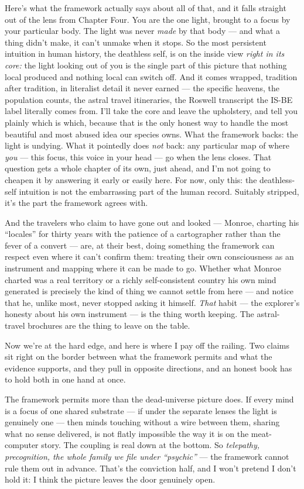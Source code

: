 \documentclass[11pt,openany]{book}
\begin{document}
Here’s what the framework actually says about all of that, and it falls straight out of the lens from Chapter Four. You are the one light, brought to a focus by your particular body. The light was never \textit{made} by that body — and what a thing didn’t make, it can’t unmake when it stops. So the most persistent intuition in human history, the deathless self, is on the inside view \textit{right in its core:} the light looking out of you is the single part of this picture that nothing local produced and nothing local can switch off. And it comes wrapped, tradition after tradition, in literalist detail it never earned — the specific heavens, the population counts, the astral travel itineraries, the Roswell transcript the IS-BE label literally comes from. I’ll take the core and leave the upholstery, and tell you plainly which is which, because that is the only honest way to handle the most beautiful and most abused idea our species owns. What the framework backs: the light is undying. What it pointedly does \textit{not} back: any particular map of where \textit{you} — this focus, this voice in your head — go when the lens closes. That question gets a whole chapter of its own, just ahead, and I’m not going to cheapen it by answering it early or easily here. For now, only this: the deathless-self intuition is not the embarrassing part of the human record. Suitably stripped, it’s the part the framework agrees with.

And the travelers who claim to have gone out and looked — Monroe, charting his “locales” for thirty years with the patience of a cartographer rather than the fever of a convert — are, at their best, doing something the framework can respect even where it can’t confirm them: treating their own consciousness as an instrument and mapping where it can be made to go. Whether what Monroe charted was a real territory or a richly self-consistent country his own mind generated is precisely the kind of thing we cannot settle from here — and notice that he, unlike most, never stopped asking it himself. \textit{That} habit — the explorer’s honesty about his own instrument — is the thing worth keeping. The astral-travel brochures are the thing to leave on the table.

Now we’re at the hard edge, and here is where I pay off the railing. Two claims sit right on the border between what the framework permits and what the evidence supports, and they pull in opposite directions, and an honest book has to hold both in one hand at once.

The framework permits more than the dead-universe picture does. If every mind is a focus of one shared substrate — if under the separate lenses the light is genuinely one — then minds touching without a wire between them, sharing what no sense delivered, is not flatly impossible the way it is on the meat-computer story. The coupling is real down at the bottom. So \textit{telepathy, precognition, the whole family we file under “psychic”} — the framework cannot rule them out in advance. That’s the conviction half, and I won’t pretend I don’t hold it: I think the picture leaves the door genuinely open.
\end{document}

